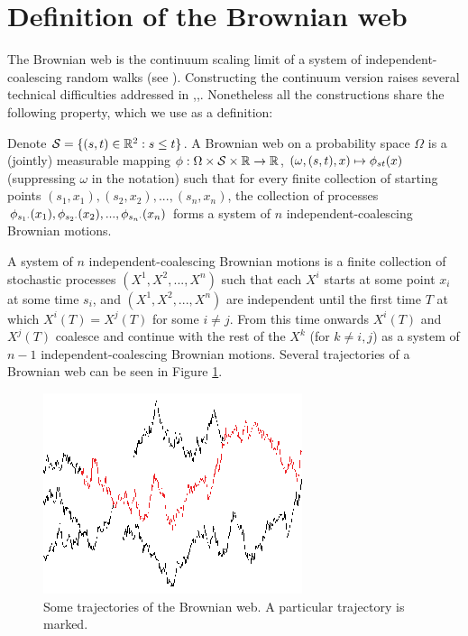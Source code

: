 {
\section{Definition of the Brownian web}
\label{sec:brownian-web-definition}

The Brownian web is the continuum scaling limit of a system of
independent-coalescing random walks (see
\cite{tsirelson-lecture-course}).  Constructing the
continuum version raises several technical difficulties addressed in
\cite{toth-werner},\cite{fontes-et-al},\cite{norris-turner-convergence-to-bw}.
Nonetheless all the
constructions share the following property, which we use as a
definition:

  Denote $\mathcal{S}=\{(s, t) \in \mathbb{R}^2 : s \le t\}$.
  A Brownian web on a probability space $\Omega$ is a (jointly)
  measurable mapping $\phi : \Omega \times \mathcal{S} \times \mathbb{R}
  \to \mathbb{R}$, $(\omega, (s, t), x) \mapsto \phi_{{s}{t}}(x)$ (suppressing
  $\omega$ in the notation) such that for every finite collection of
  starting points $(s_1, x_1),(s_2, x_2),...,(s_n, x_n)$, the
  collection of processes $\phi_{{s_1}{\cdot}}(x_1),
  \phi_{{s_2}{\cdot}}(x_2),...,\phi_{{s_n}{\cdot}}(x_n)$
  forms a system of $n$ independent-coalescing Brownian motions.

  \newcommand{\bm}[1]{X^{#1}}

  A system of $n$ independent-coalescing Brownian motions is a finite
  collection of stochastic processes $(\bm{1}, \bm{2},...,\bm{n})$ such that
  each $\bm{i}$ starts at some point $x_i$ at some time $s_i$, and $(\bm{1},
  \bm{2},...,\bm{n})$ are independent until the first time $T$ at which
  $\bm{i}(T)=\bm{j}(T)$ for some $i\neq j$. From this time onwards $\bm{i}(T)$
  and $\bm{j}(T)$ coalesce and continue with the rest of the $\bm{k}$ (for
  $k\neq i,j$) as a system of $n-1$ independent-coalescing Brownian motions.
  Several trajectories of a Brownian web can be seen in Figure
  \ref{fig:bw-trajectories}.

\begin{figure}
   \centering
   \includegraphics[scale=2]{sometraj.eps}
   \caption{Some trajectories of the Brownian web. A particular trajectory is marked.}
  \label{fig:bw-trajectories}
\end{figure}
}
